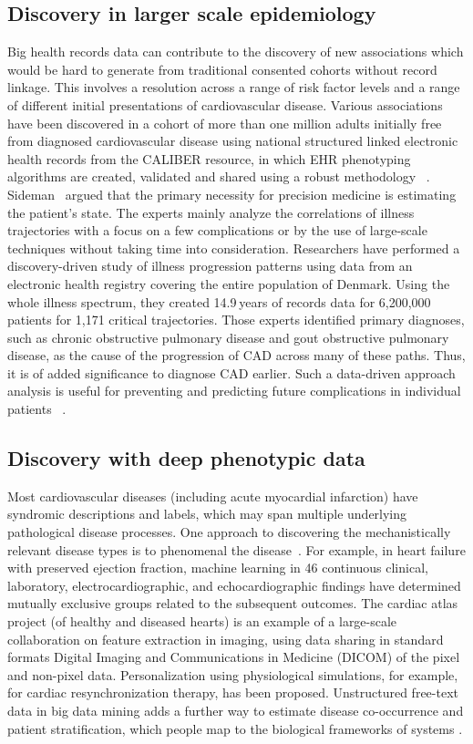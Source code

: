 \subsection{Discovery in larger scale epidemiology}
Big health records data can contribute to the discovery of new
associations which would be hard to generate from traditional
consented cohorts without record linkage. 
 This involves a resolution across a range of risk factor levels and a
 range of different initial presentations of cardiovascular disease.
 Various associations have been discovered in a cohort of more than
 one million adults initially free from diagnosed cardiovascular
 disease using national structured linked electronic health records
 from the CALIBER resource, in which EHR phenotyping algorithms are
 created, validated and shared using a robust methodology
~\cite{wang2005framingham}. Sideman~\cite{sideman1985simulation}
 argued that the primary necessity for precision medicine is
 estimating the patient's state. The experts mainly analyze the
 correlations of illness trajectories with a focus on a few
 complications or by the use of large-scale techniques without taking
 time into consideration. Researchers have performed a
 discovery-driven study of illness progression patterns using data
 from an electronic health registry covering the entire population of
 Denmark. Using the whole illness spectrum, they created 14.9 years of
 records data for 6,200,000 patients for 1,171 critical trajectories.
 Those experts identified primary diagnoses, such as chronic
 obstructive pulmonary disease and gout obstructive pulmonary disease,
 as the cause of the progression of CAD across many of these paths.
 Thus, it is of added significance to diagnose CAD earlier. Such a
 data-driven approach analysis is useful for preventing and predicting
 future complications in individual patients
~\cite{sideman1985simulation}.

\subsection{Discovery with deep phenotypic data}

Most cardiovascular diseases (including acute myocardial infarction)
have syndromic descriptions and labels, which may span multiple
underlying pathological disease processes. One approach to discovering
the mechanistically relevant disease types is to phenomenal the
disease~\cite{sahaf2011comparing}. For example, in heart failure with
preserved ejection fraction, machine learning in 46 continuous
clinical, laboratory, electrocardiographic, and echocardiographic
findings have determined mutually exclusive groups related to the
subsequent outcomes. The cardiac atlas project (of healthy and
diseased hearts) is an example of a large-scale collaboration on
feature extraction in imaging, using data sharing in standard formats
Digital Imaging and Communications in Medicine (DICOM) of the pixel
and non-pixel data. Personalization using physiological simulations,
for example, for cardiac resynchronization therapy, has been proposed.
Unstructured free-text data in big data mining adds a further way to
estimate disease co-occurrence and patient stratification, which
people map to the biological frameworks of systems
\cite{sahaf2011comparing}.


